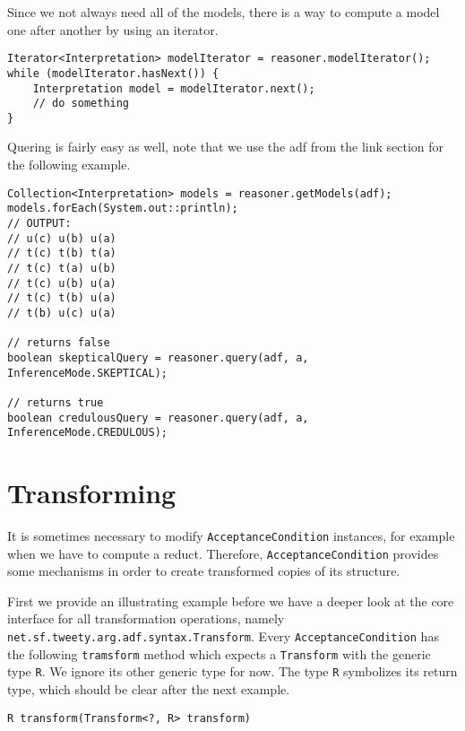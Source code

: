 \documentclass{scrartcl}[a4paper,10pt]
\newcommand{\jlstinline}[1]{\lstinline[style=java]|#1|}
\begin{document}
Since we not always need all of the models, there is a way to compute a model one after another by using an iterator.

\begin{lstlisting}[style=java,caption=Iteratively computing the models]
Iterator<Interpretation> modelIterator = reasoner.modelIterator();
while (modelIterator.hasNext()) {
	Interpretation model = modelIterator.next();
	// do something
}
\end{lstlisting}

Quering is fairly easy as well, note that we use the adf from the link section for the following example.

\begin{lstlisting}[style=java,caption=Querying]
Collection<Interpretation> models = reasoner.getModels(adf);
models.forEach(System.out::println);
// OUTPUT:
// u(c) u(b) u(a)
// t(c) t(b) t(a)
// t(c) t(a) u(b)
// t(c) u(b) u(a)
// t(c) t(b) u(a)
// t(b) u(c) u(a)

// returns false
boolean skepticalQuery = reasoner.query(adf, a, InferenceMode.SKEPTICAL);

// returns true
boolean credulousQuery = reasoner.query(adf, a, InferenceMode.CREDULOUS);
\end{lstlisting}

\section{Transforming}

It is sometimes necessary to modify \jlstinline{AcceptanceCondition} instances, for example when we have to compute a reduct. Therefore, \jlstinline{AcceptanceCondition} provides some mechanisms in order to create transformed copies of its structure.

First we provide an illustrating example before we have a deeper look at the core interface for all transformation operations, namely \jlstinline{net.sf.tweety.arg.adf.syntax.Transform}. Every \jlstinline{AcceptanceCondition} has the following \jlstinline{tramsform} method which expects a \jlstinline{Transform} with the generic type \jlstinline{R}. We ignore its other generic type for now. The type \jlstinline{R} symbolizes its return type, which should be clear after the next example.

\begin{lstlisting}[style=java,caption=Transform-Method Signature]
R transform(Transform<?, R> transform)
\end{lstlisting}
\end{document}
